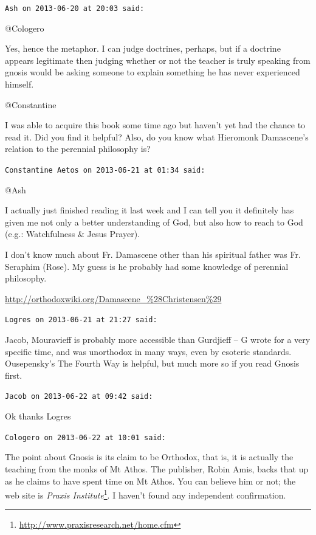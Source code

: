 \begin{footnotesize}
\begin{sffamily}
\hfill

\texttt{Ash on 2013-06-20 at 20:03 said:}

@Cologero

Yes, hence the metaphor. I can judge doctrines, perhaps, but if a doctrine appears legitimate then judging whether or not the teacher is truly speaking from gnosis would be asking someone to explain something he has never experienced himself.

@Constantine

I was able to acquire this book some time ago but haven't yet had the chance to read it. Did you find it helpful? Also, do you know what Hieromonk Damascene's relation to the perennial philosophy is?

\hfill

\texttt{Constantine Aetos on 2013-06-21 at 01:34 said:}

@Ash

I actually just finished reading it last week and I can tell you it definitely has given me not only a better understanding of God, but also how to reach to God (e.g.: Watchfulness \& Jesus Prayer).

I don't know much about Fr. Damascene other than his spiritual father was Fr. Seraphim (Rose). My guess is he probably had some knowledge of perennial philosophy.

\url{http://orthodoxwiki.org/Damascene\_\%28Christensen\%29}


\hfill

\texttt{Logres on 2013-06-21 at 21:27 said:}

Jacob, Mouravieff is probably more accessible than Gurdjieff -- G wrote for a very specific time, and was unorthodox in many ways, even by esoteric standards. Ousepensky's The Fourth Way is helpful, but much more so if you read Gnosis first.

\hfill

\texttt{Jacob on 2013-06-22 at 09:42 said:}

Ok thanks Logres

\hfill

\texttt{Cologero on 2013-06-22 at 10:01 said:}

The point about Gnosis is its claim to be Orthodox, that is, it is actually the teaching from the monks of Mt Athos. The publisher, Robin Amis, backs that up as he claims to have spent time on Mt Athos. You can believe him or not; the web site is \textit{Praxis Institute}\footnote{\url{http://www.praxisresearch.net/home.cfm}}. I haven't found any independent confirmation.


\end{sffamily}
\end{footnotesize}

